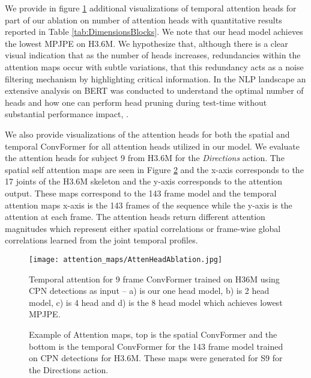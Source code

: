 \documentclass{article}
\begin{document}
We provide in figure \ref{fig:attentionablation} additional visualizations of temporal attention heads for part of our ablation on number of attention heads with quantitative results reported in Table \ref{tab:DimensionsBlocks}. We note that our  head model achieves the lowest MPJPE on H3.6M. We hypothesize that, although there is a clear visual indication that as the number of heads increases, redundancies within the attention maps occur with subtle variations, that this redundancy acts as a noise filtering mechanism by highlighting critical information. In the NLP landscape an extensive analysis on BERT was conducted to understand the optimal number of heads and how one can perform head pruning during test-time without substantial performance impact, \cite{MLN19}.

We also provide visualizations of the attention heads for both the spatial and temporal ConvFormer for all attention  heads utilized in our model. We evaluate the attention heads for subject 9 from H3.6M for the \textit{Directions} action. The spatial self attention maps are seen in Figure \ref{fig:attention} and the x-axis corresponds to the 17 joints of the H3.6M skeleton and the y-axis corresponds to the attention output. These maps correspond to the 143 frame model and the temporal attention maps x-axis is the 143 frames of the sequence while the y-axis is the attention at each frame. The attention heads return different attention magnitudes which represent either spatial correlations or frame-wise global correlations learned from the joint temporal profiles. 

\begin{figure}[!htb]
    \centering
    \texttt{[image: attention\_maps/AttenHeadAblation.jpg]}
    \caption{\small Temporal attention for 9 frame ConvFormer trained on H36M using CPN detections as input -- a) is our one head model, b) is 2 head model, c) is 4 head and d) is the 8 head model which achieves lowest MPJPE.}
    \label{fig:attentionablation}
\end{figure}


\begin{figure}[!htb]
    \centering
    \caption{\small Example of Attention maps, top is the spatial ConvFormer and the bottom is the temporal ConvFormer for the 143 frame model trained on CPN detections for H3.6M. These maps were generated for S9 for the Directions action.}
    \label{fig:attention}
\end{figure}
\end{document}
